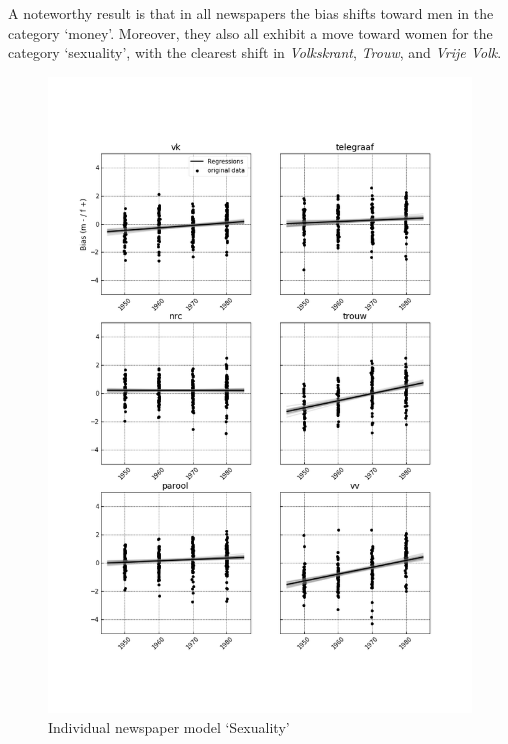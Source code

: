 \documentclass[11pt,a4paper]{article}
\begin{document}
A noteworthy result is that in all newspapers the bias shifts toward men in the category `money'. Moreover, they also all exhibit a move toward women for the category `sexuality', with the clearest shift in \textit{Volkskrant}, \textit{Trouw}, and \textit{Vrije Volk}. 
\begin{figure}
  \includegraphics[width=\linewidth]{figures/indiv_Sexual}
  \vspace*{-15mm}
  \caption{Individual newspaper model `Sexuality'}
  \label{fig:indiv_sexuality}
\end{figure}
\end{document}
